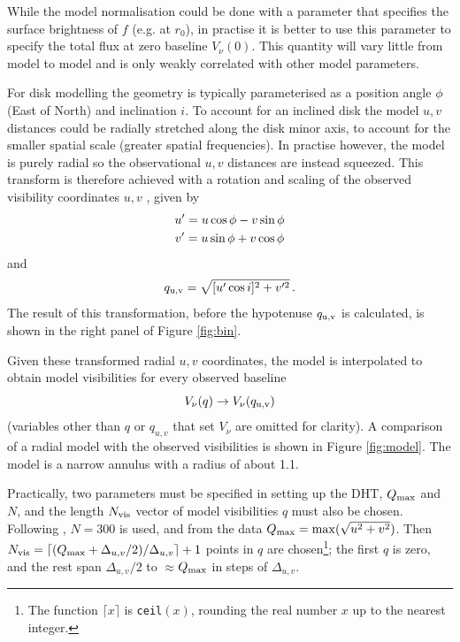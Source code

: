 \documentclass[fleqn,usenatbib]{mnras}
\begin{document}
While the model normalisation could be done with a parameter that specifies the surface brightness of $f$ (e.g. at $r_0$), in practise it is better to use this parameter to specify the total flux at zero baseline $V_\nu(0)$. This quantity will vary little from model to model and is only weakly correlated with other model parameters.

For disk modelling the geometry is typically parameterised as a position angle $\phi$ (East of North) and inclination $i$. To account for an inclined disk the model $u,v$ distances could be radially stretched along the disk minor axis, to account for the smaller spatial scale (greater spatial frequencies). In practise however, the model is purely radial so the observational $u,v$ distances are instead squeezed. This transform is therefore achieved with a rotation and scaling of the observed visibility coordinates $u,v$ \citep[e.g. as in][]{2018MNRAS.476.4527T}, given by
\begin{gather}
    u' = u \cos \phi - v \sin \phi \notag \\
    v' = u \sin \phi + v \cos \phi
\end{gather}
and 
\begin{equation}\label{eq:trans}
    q_{\rm u,v} = \sqrt{[u' \cos i]^2 + v'^2} \, .
\end{equation}
The result of this transformation, before the hypotenuse $q_{\rm u,v}$ is calculated, is shown in the right panel of Figure \ref{fig:bin}.

Given these transformed radial $u,v$ coordinates, the model is interpolated to obtain model visibilities for every observed baseline
\begin{equation}
    V_\nu(q) \rightarrow V_\nu(q_{\rm u,v})
\end{equation}
(variables other than $q$ or $q_{u,v}$ that set $V_\nu$ are omitted for clarity). A comparison of a radial model with the observed visibilities is shown in Figure \ref{fig:model}. The model is a narrow annulus with a radius of about 1.1\arcsec.

Practically, two parameters must be specified in setting up the DHT, $Q_{\rm max}$ and $N$, and the length $N_{\rm vis}$ vector of model visibilities $q$ must also be chosen. Following \citet{2020MNRAS.tmp.1491J}, $N=300$ is used, and from the data $Q_{\rm max} = \max(\sqrt{u^2+v^2})$. Then $N_{\rm vis} = \lceil (Q_{\rm max}+\Delta_{u,v}/2)/\Delta_{u,v} \rceil + 1$ points in $q$ are chosen\footnote{The function $\lceil x \rceil$ is \texttt{ceil}$(x)$, rounding the real number $x$ up to the nearest integer.}; the first $q$ is zero, and the rest span $\Delta_{u,v}/2$ to $\approx$$Q_{\rm max}$ in steps of $\Delta_{u,v}$.
\end{document}
